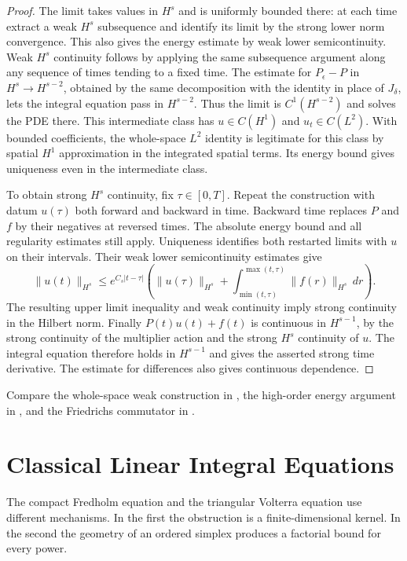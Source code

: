 \documentclass[11pt,oneside,openany]{book}
\theoremstyle{plain}
\theoremstyle{definition}
\theoremstyle{remark}
\begin{document}
\begin{proof}
The limit takes values in \(H^s\) and is uniformly bounded there:
at each time extract a weak \(H^s\) subsequence and identify its
limit by the strong lower norm convergence. This also gives
the energy estimate by weak lower semicontinuity. Weak \(H^s\)
continuity follows by applying the same subsequence argument
along any sequence of times tending to a fixed time. The estimate
for \(P_\epsilon-P\) in \(H^s\to H^{s-2}\), obtained by the same
decomposition with the identity in place of \(J_\delta\), lets
the integral equation pass in \(H^{s-2}\). Thus the limit is
\(C^1(H^{s-2})\) and solves the PDE there. This intermediate
class has \(u\in C(H^1)\) and \(u_t\in C(L^2)\).
With bounded coefficients, the whole-space \(L^2\) identity is
legitimate for this class by spatial \(H^1\) approximation in
the integrated spatial terms. Its energy bound gives uniqueness
even in the intermediate class.

To obtain strong \(H^s\) continuity, fix \(\tau\in[0,T]\).
Repeat the construction with datum \(u(\tau)\) both forward
and backward in time. Backward time replaces \(P\) and \(f\)
by their negatives at reversed times. The absolute energy
bound and all regularity estimates still apply. Uniqueness
identifies both restarted limits with \(u\) on their intervals.
Their weak lower semicontinuity estimates give
\[
 \|u(t)\|_{H^s}\leq e^{C_s|t-\tau|}
 \left(\|u(\tau)\|_{H^s}
           +\int_{\min(t,\tau)}^{\max(t,\tau)}
                            \|f(r)\|_{H^s}\,dr\right).
\]
The resulting upper limit inequality and weak continuity imply
strong continuity in the Hilbert norm. Finally \(P(t)u(t)+f(t)\)
is continuous in \(H^{s-1}\), by the strong continuity of the
multiplier action and the strong \(H^s\) continuity of \(u\).
The integral equation therefore holds in \(H^{s-1}\) and gives
the asserted strong time derivative. The estimate for differences
also gives continuous dependence.
\end{proof}

Compare the whole-space weak construction in
\cite[Section 7.3.2]{Evans}, the high-order energy argument in
\cite[Chapter 5, Section 3]{John}, and the Friedrichs commutator
in \cite[Section 12.3.1]{RR}.
\chapter{Classical Linear Integral Equations}
\label{chap:pde-integral}

The compact Fredholm equation and the triangular Volterra equation
use different mechanisms. In the first the obstruction is a
finite-dimensional kernel. In the second the geometry of an
ordered simplex produces a factorial bound for every power.
\end{document}
